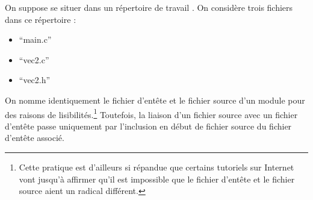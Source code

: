 \documentclass[../../../main.tex]{subfiles}
\begin{document}
On suppose se situer dans un répertoire de travail . On considère trois fichiers dans ce répertoire :
\begin{itemize}
	\item ``main.c''
	\item ``vec2.c''
	\item ``vec2.h''
\end{itemize}
On nomme identiquement le fichier d'entête et le fichier source d'un module pour des raisons de lisibilités.\footnote{Cette pratique est d'ailleurs si répandue que certains tutoriels sur Internet vont jusqu'à affirmer qu'il est impossible que le fichier d'entête et le fichier source aient un radical différent.} Toutefois, la liaison d'un fichier source avec un fichier d'entête passe uniquement par l'inclusion en début de fichier source du fichier d'entête associé.
 
\end{document}
